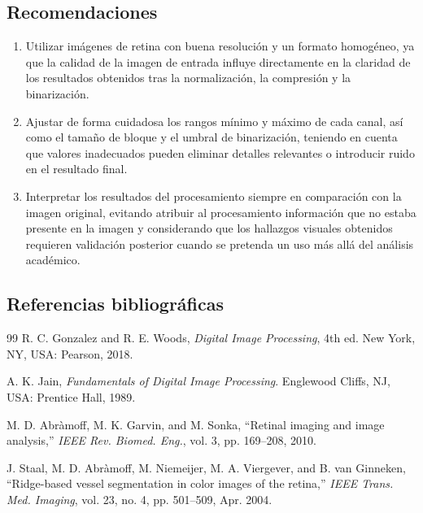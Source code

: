 \documentclass[11pt]{article}
\begin{document}
\subsection{Recomendaciones}
\begin{enumerate}
    \item Utilizar imágenes de retina con buena resolución y un formato homogéneo, ya que la calidad de la imagen de entrada influye directamente en la claridad de los resultados obtenidos tras la normalización, la compresión y la binarización.

    \item Ajustar de forma cuidadosa los rangos mínimo y máximo de cada canal, así como el tamaño de bloque y el umbral de binarización, teniendo en cuenta que valores inadecuados pueden eliminar detalles relevantes o introducir ruido en el resultado final.

    \item Interpretar los resultados del procesamiento siempre en comparación con la imagen original, evitando atribuir al procesamiento información que no estaba presente en la imagen y considerando que los hallazgos visuales obtenidos requieren validación posterior cuando se pretenda un uso más allá del análisis académico.
\end{enumerate}

\subsection{Referencias bibliográficas}
{
    \renewcommand{\refname}{}
    \vspace{-1.5em}

    \begin{thebibliography}{99}
        R. C. Gonzalez and R. E. Woods, \textit{Digital Image Processing}, 4th ed. New York, NY, USA: Pearson, 2018.

        A. K. Jain, \textit{Fundamentals of Digital Image Processing}. Englewood Cliffs, NJ, USA: Prentice Hall, 1989.

        M. D. Abr\`amoff, M. K. Garvin, and M. Sonka, ``Retinal imaging and image analysis,'' \textit{IEEE Rev. Biomed. Eng.}, vol. 3, pp. 169--208, 2010.

        J. Staal, M. D. Abr\`amoff, M. Niemeijer, M. A. Viergever, and B. van Ginneken, ``Ridge-based vessel segmentation in color images of the retina,'' \textit{IEEE Trans. Med. Imaging}, vol. 23, no. 4, pp. 501--509, Apr. 2004.
    \end{thebibliography}
}
\end{document}
